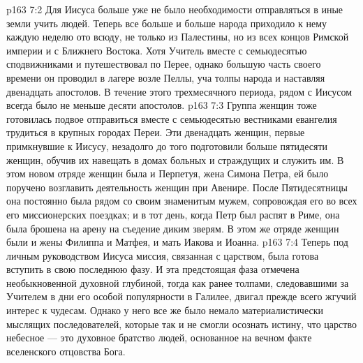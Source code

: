 \vs p163 7:2 Для Иисуса больше уже не было необходимости отправляться в иные земли учить людей. Теперь все больше и больше народа приходило к нему каждую неделю ото всюду, не только из Палестины, но из всех концов Римской империи и с Ближнего Востока. Хотя Учитель вместе с семьюдесятью сподвижниками и путешествовал по Перее, однако большую часть своего времени он проводил в лагере возле Пеллы, уча толпы народа и наставляя двенадцать апостолов. В течение этого трехмесячного периода, рядом с Иисусом всегда было не меньше десяти апостолов.
\vs p163 7:3 Группа женщин тоже готовилась подвое отправиться вместе с семьюдесятью вестниками евангелия трудиться в крупных городах Переи. Эти двенадцать женщин, первые примкнувшие к Иисусу, незадолго до того подготовили больше пятидесяти женщин, обучив их навещать в домах больных и страждущих и служить им. В этом новом отряде женщин была и Перпетуя, жена Симона Петра, ей было поручено возглавить деятельность женщин при Авенире. После Пятидесятницы она постоянно была рядом со своим знаменитым мужем, сопровождая его во всех его миссионерских поездках; и в тот день, когда Петр был распят в Риме, она была брошена на арену на съедение диким зверям. В этом же отряде женщин были и жены Филиппа и Матфея, и мать Иакова и Иоанна.
\vs p163 7:4 Теперь под личным руководством Иисуса миссия, связанная с царством, была готова вступить в свою последнюю фазу. И эта предстоящая фаза отмечена необыкновенной духовной глубиной, тогда как ранее толпами, следовавшими за Учителем в дни его особой популярности в Галилее, двигал прежде всего жгучий интерес к чудесам. Однако у него все же было немало материалистически мыслящих последователей, которые так и не смогли осознать истину, что царство небесное --- это духовное братство людей, основанное на вечном факте вселенского отцовства Бога.
